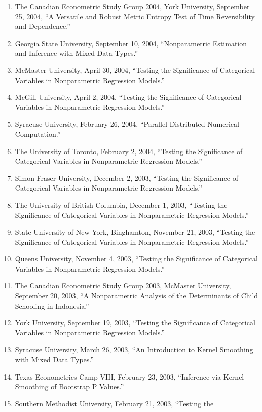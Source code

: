 \documentclass[
]{article}
\begin{document}
\begin{enumerate}
\item
  The Canadian Econometric Study Group 2004, York University, September
  25, 2004, ``A Versatile and Robust Metric Entropy Test of Time
  Reversibility and Dependence.''
\item
  Georgia State University, September 10, 2004, ``Nonparametric
  Estimation and Inference with Mixed Data Types.''
\item
  McMaster University, April 30, 2004, ``Testing the Significance of
  Categorical Variables in Nonparametric Regression Models.''
\item
  McGill University, April 2, 2004, ``Testing the Significance of
  Categorical Variables in Nonparametric Regression Models.''
\item
  Syracuse University, February 26, 2004, ``Parallel Distributed
  Numerical Computation.''
\item
  The University of Toronto, February 2, 2004, ``Testing the
  Significance of Categorical Variables in Nonparametric Regression
  Models.''
\item
  Simon Fraser University, December 2, 2003, ``Testing the Significance
  of Categorical Variables in Nonparametric Regression Models.''
\item
  The University of British Columbia, December 1, 2003, ``Testing the
  Significance of Categorical Variables in Nonparametric Regression
  Models.''
\item
  State University of New York, Binghamton, November 21, 2003, ``Testing
  the Significance of Categorical Variables in Nonparametric Regression
  Models.''
\item
  Queens University, November 4, 2003, ``Testing the Significance of
  Categorical Variables in Nonparametric Regression Models.''
\item
  The Canadian Econometric Study Group 2003, McMaster University,
  September 20, 2003, ``A Nonparametric Analysis of the Determinants of
  Child Schooling in Indonesia.''
\item
  York University, September 19, 2003, ``Testing the Significance of
  Categorical Variables in Nonparametric Regression Models.''
\item
  Syracuse University, March 26, 2003, ``An Introduction to Kernel
  Smoothing with Mixed Data Types.''
\item
  Texas Econometrics Camp VIII, February 23, 2003, ``Inference via
  Kernel Smoothing of Bootstrap P Values.''
\item
  Southern Methodist University, February 21, 2003, ``Testing the

\end{enumerate}
\end{document}
